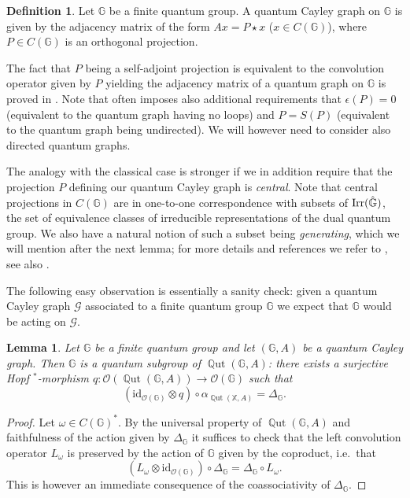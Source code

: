\documentclass[12pt]{amsart}
\newtheorem{lem}[thm]{Lemma}
\theoremstyle{definition}
\theoremstyle{definition}
\theoremstyle{definition}
\newtheorem{defn}[thm]{Definition}
\theoremstyle{definition}
\DeclareMathOperator{\Qut}{\mathbb{Q}ut}
\newcommand{\id}{\mathrm{id}}
\newcommand{\G}{\mathbb{G}}
\newcommand{\X}{\mathbb{X}}
\newcommand{\cO}{\mathcal{O}}
\numberwithin{equation}{section}
\begin{document}
\begin{defn}\cite{Was24} \label{def:Qcayley}
    Let $\G$ be a finite quantum group. A quantum Cayley graph on $\G$ is given by the adjacency matrix of the form $Ax = P \star x$ ($x \in C(\G)$), where $P \in C(\G)$ is an orthogonal projection.
\end{defn}

The fact that $P$ being a self-adjoint projection is equivalent to the convolution operator given by $P$ yielding the adjacency matrix of a quantum graph on $\G$ is proved in \cite[Section 4.2]{Was24}. Note that \cite{Was24} often imposes also additional requirements that $\epsilon(P) = 0$ (equivalent to the quantum graph having no loops) and $P= S(P)$ (equivalent to the quantum graph being undirected). We will however need to consider also directed quantum graphs.

The analogy with the classical case is stronger if we in addition require that the projection $P$ defining our quantum Cayley graph is \emph{central}. Note that central projections in $C(\G)$ are in one-to-one correspondence with subsets of $\textup{Irr} (\hat{\G})$, the set of equivalence classes of irreducible representations of the dual quantum group. We also have a natural notion of such a subset being \emph{generating}, which we will mention after the next lemma; for more details and references we refer to \cite[Section 4]{Was24}, see also \cite{Fim10}.


The following easy observation is essentially a sanity check: given a quantum Cayley graph $\mathcal{G}$ associated to a finite quantum group $\G$ we expect that $\G$ would be acting on $\mathcal{G}$.

\begin{lem} \label{lem:G as a subgroup}
Let $\G$ be a finite quantum group and let $(\G, A)$ be a quantum Cayley graph. Then $\G$ is a quantum subgroup of $\Qut(\G,A)$: there exists a surjective Hopf $^*$-morphism $q:\cO(\Qut(\G,A)) \to \cO(\G)$ such that 
\[  (\id_{\cO(\G)} \otimes q) \circ \alpha_{\Qut(\X,A)} = \Delta_\G.  \]
\end{lem}
\begin{proof}
Let $\omega \in C(\G)^*$. By the universal property of $\Qut(\G,A)$ and faithfulness of the action given by $\Delta_\G$ it suffices to check that the left convolution operator $L_\omega$ is preserved by the action of $\G$ given by the coproduct, i.e.\ that
 \[ (L_\omega \otimes \id_{\cO(\G)}) \circ \Delta_\G = \Delta_\G \circ L_\omega. \]
This is however an immediate consequence of the coassociativity of $\Delta_\G$.     
\end{proof}
\end{document}
